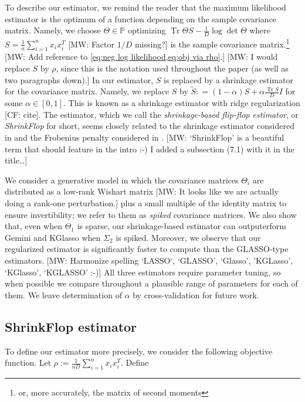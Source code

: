 \documentclass[aos]{imsart}
\theoremstyle{definition}
\numberwithin{equation}{section}
\DeclareMathOperator{\tr}{Tr}
\renewcommand{\P}{{\mathbb{P}}}
\newcommand{\samp}{x}
\newcommand{\CF}[1]{{\color{purple}[CF: #1]}}
\newcommand{\MW}[1]{{\color{red}[MW: #1]}}
\newcommand{\CF}[1]{{}}
\newcommand{\MW}[1]{{}}
\begin{document}
To describe our estimator, we remind the reader that the maximum likelihood estimator is the optimum of a function depending on the sample covariance matrix.
Namely, we choose $\Theta \in \P$ optimizing $\tr \Theta S - \frac{1}{D}\log \det \Theta$ where $S = \frac{1}{n} \sum_{i = 1}^n x_i x_i^T$ \MW{Factor $1/D$ missing?} is the sample covariance matrix.\footnote{or, more accurately, the matrix of second moments}
\MW{Add reference to \cref{eq:neg log likelihood,eq:obj via rho}.}
\MW{I would replace $S$ by $\rho$, since this is the notation used throughout the paper (as well as two paragraphs down).}
In our estimator, $S$ is replaced by a shrinkage estimator for the covariance matrix.
Namely, we replace $S$ by $\tilde{S}: = (1- \alpha) S + \alpha \frac{\tr S}{D} I $ for some $\alpha \in [0,1]$.
This is known as a shrinkage estimator with ridge regularization \CF{cite}.
The estimator, which we call the \emph{shrinkage-based flip-flop estimator}, or \emph{ShrinkFlop} for short, seems closely related to the shrinkage estimator considered in \cite{goes2020robust} and the Frobenius penalty considered in \cite{tang2018integrated}.
\MW{`ShrinkFlop' is a beautiful term that should feature in the intro :-) I added a subsection (7.1) with it in the title\dots}

We consider a generative model in which the covariance matrices $\Theta_i$ are distributed as a low-rank Wishart matrix \MW{It looks like we are actually doing a rank-one perturbation.} plus a small multiple of the identity matrix to ensure invertibility; we refer to them as \emph{spiked} covariance matrices.
We also show that, even when $\Theta_1$ is sparse, our shrinkage-based estimator can outputerform Gemini and KGlasso when $\Sigma_2$ is spiked.
Moreover, we observe that our regularized estimator is significantly faster to compute than the GLASSO-type estimators.
\MW{Harmonize spelling `LASSO`, `GLASSO', `Glasso', 'KGLasso', `KGlasso', `KGLASSO' :-)}
All three estimators require parameter tuning, so when possible we compare throughout a plausible range of parameters for each of them. We leave determination of $\alpha$ by cross-validation for future work.

\subsection{ShrinkFlop estimator}
To define our estimator more precisely, we consider the following objective function.
Let $\rho:= \frac{1}{nD} \sum_{i = 1}^n \samp_i \samp_i^T$. Define
\end{document}
